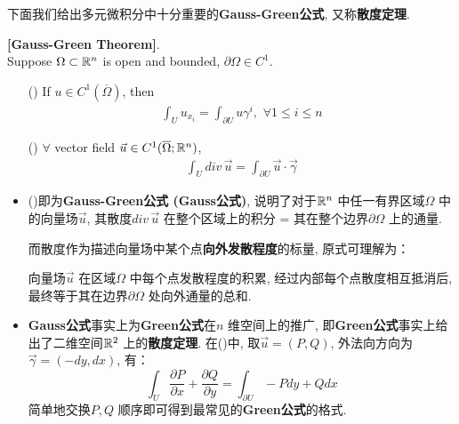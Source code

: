 	\vspace{6em}

	下面我们给出多元微积分中十分重要的\textbf{Gauss-Green公式}, 又称\textbf{散度定理}.

	\begin{thm}\label{thm B.4.1}
		\textbf{[Gauss-Green Theorem]}. \\
		Suppose $\Omega \subset \mathbb{R}^n$ is open and bounded, $\partial \Omega \in C^1$.
		\begin{enumerate}
			\item[(\rmnum{1})] If $u \in C^{1}(\overline{\Omega})$, then
			\begin{align}
				\int_{U} u_{x_i} = \int_{\partial U} u \gamma^i , \,\, \forall 1 \leq i \leq n
			\end{align}
		
			\item[(\rmnum{2})] $\forall$ vector field $\vec{u} \in C^{1}(\overline{\Omega} ; \mathbb{R}^n)$,
			\begin{align}
				\int_{U} div \, \vec{u} = \int_{\partial U} \vec{u} \cdot \vec{\gamma}
			\end{align}
		\end{enumerate}
	
		\vspace{2em}
	
		\begin{rmk}
			\begin{itemize}
				\item ()即为\textbf{Gauss-Green公式 (Gauss公式)}, 说明了对于$\mathbb{R}^n$ 中任一有界区域$\Omega$ 中的向量场$\vec{u}$, 其散度$div \, \vec{u}$ 在整个区域上的积分 = 其在整个边界$\partial \Omega$ 上的通量.
			
				\vspace{1em}
			
				而散度作为描述向量场中某个点\textbf{向外发散程度}的标量, 原式可理解为：
				\begin{center}
					向量场$\vec{u}$ 在区域$\Omega$ 中每个点发散程度的积累, 经过内部每个点散度相互抵消后, 最终等于其在边界$\partial \Omega$ 处向外通量的总和.
				\end{center}
			
				\newpage
			
				\item \textbf{Gauss公式}事实上为\textbf{Green公式}在$n$ 维空间上的推广, 即\textbf{Green公式}事实上给出了二维空间$\mathbb{R}^2$ 上的\textbf{散度定理}. 在()中, 取$\vec{u} = (P , Q)$, 外法向方向为$\vec{\gamma} = (-dy , dx)$, 有：
				\[ \int_{U} \frac{\partial P}{\partial x} + \frac{\partial Q}{\partial y} 
				= \int_{\partial U} -P dy + Q dx \]
				简单地交换$P , Q$ 顺序即可得到最常见的\textbf{Green公式}的格式.
			

\end{itemize}
\end{rmk}
\end{thm}

